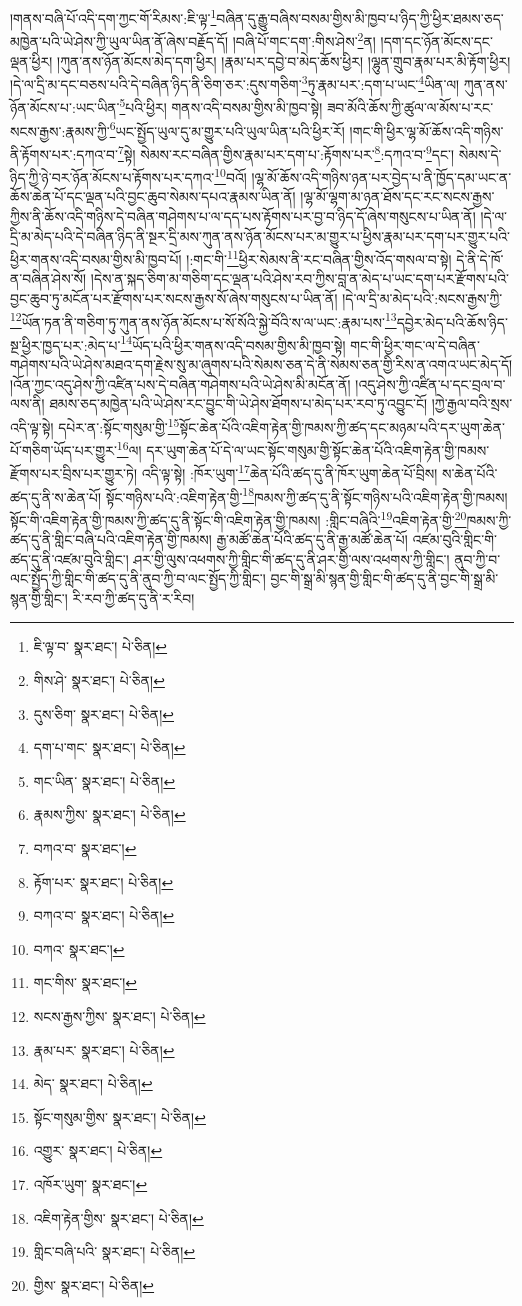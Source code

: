 །གནས་བཞི་པོ་འདི་དག་ཀྱང་གོ་རིམས་:ཇི་ལྟ་\footnote{ཇི་ལྟ་བ་  སྣར་ཐང་།  པེ་ཅིན། }བཞིན་དུ་རྒྱུ་བཞིས་བསམ་གྱིས་མི་ཁྱབ་པ་ཉིད་ཀྱི་ཕྱིར་ཐམས་ཅད་མཁྱེན་པའི་ཡེ་ཤེས་ཀྱི་ཡུལ་ཡིན་ནོ་ཞེས་བརྗོད་དོ། །བཞི་པོ་གང་དག་:གིས་ཤེས་\footnote{གིས་ཤེ་  སྣར་ཐང་།  པེ་ཅིན། }ན། །དག་དང་ཉོན་མོངས་དང་ལྡན་ཕྱིར། །ཀུན་ནས་ཉོན་མོངས་མེད་དག་ཕྱིར། །རྣམ་པར་དབྱེ་བ་མེད་ཆོས་ཕྱིར། །ལྷུན་གྲུབ་རྣམ་པར་མི་རྟོག་ཕྱིར། །དེ་ལ་དྲི་མ་དང་བཅས་པའི་དེ་བཞིན་ཉིད་ནི་ཅིག་ཅར་:དུས་གཅིག་\footnote{དུས་ཅིག་  སྣར་ཐང་།  པེ་ཅིན། }ཏུ་རྣམ་པར་:དག་པ་ཡང་\footnote{དག་པ་གང་  སྣར་ཐང་།  པེ་ཅིན། }ཡིན་ལ། ཀུན་ནས་ཉོན་མོངས་པ་:ཡང་ཡིན་\footnote{གང་ཡིན་  སྣར་ཐང་།  པེ་ཅིན། }པའི་ཕྱིར། གནས་འདི་བསམ་གྱིས་མི་ཁྱབ་སྟེ། ཟབ་མོའི་ཆོས་ཀྱི་ཚུལ་ལ་མོས་པ་རང་སངས་རྒྱས་:རྣམས་ཀྱི་\footnote{རྣམས་ཀྱིས་  སྣར་ཐང་།  པེ་ཅིན། }ཡང་སྤྱོད་ཡུལ་དུ་མ་གྱུར་པའི་ཡུལ་ཡིན་པའི་ཕྱིར་རོ། །གང་གི་ཕྱིར་ལྷ་མོ་ཆོས་འདི་གཉིས་ནི་རྟོགས་པར་:དཀའ་བ་\footnote{བཀའ་བ་  སྣར་ཐང་། }སྟེ། སེམས་རང་བཞིན་གྱིས་རྣམ་པར་དག་པ་:རྟོགས་པར་\footnote{རྟོག་པར་  སྣར་ཐང་།  པེ་ཅིན། }:དཀའ་བ་\footnote{བཀའ་བ་  སྣར་ཐང་།  པེ་ཅིན། }དང་། སེམས་དེ་ཉིད་ཀྱི་ཉེ་བར་ཉོན་མོངས་པ་རྟོགས་པར་དཀའ་\footnote{བཀའ་  སྣར་ཐང་། }བའོ། །ལྷ་མོ་ཆོས་འདི་གཉིས་ཉན་པར་བྱེད་པ་ནི་ཁྱོད་དམ་ཡང་ན་ཆོས་ཆེན་པོ་དང་ལྡན་པའི་བྱང་ཆུབ་སེམས་དཔའ་རྣམས་ཡིན་ནོ། །ལྷ་མོ་ལྷག་མ་ཉན་ཐོས་དང་རང་སངས་རྒྱས་ཀྱིས་ནི་ཆོས་འདི་གཉིས་དེ་བཞིན་གཤེགས་པ་ལ་དད་པས་རྟོགས་པར་བྱ་བ་ཉིད་དོ་ཞེས་གསུངས་པ་ཡིན་ནོ། །དེ་ལ་དྲི་མ་མེད་པའི་དེ་བཞིན་ཉིད་ནི་སྔར་དྲི་མས་ཀུན་ནས་ཉོན་མོངས་པར་མ་གྱུར་པ་ཕྱིས་རྣམ་པར་དག་པར་གྱུར་པའི་ཕྱིར་གནས་འདི་བསམ་གྱིས་མི་ཁྱབ་པོ། །:གང་གི་\footnote{གང་གིས་  སྣར་ཐང་། }ཕྱིར་སེམས་ནི་རང་བཞིན་གྱིས་འོད་གསལ་བ་སྟེ། དེ་ནི་དེ་ཁོ་ན་བཞིན་ཤེས་སོ། །དེས་ན་སྐད་ཅིག་མ་གཅིག་དང་ལྡན་པའི་ཤེས་རབ་ཀྱིས་བླ་ན་མེད་པ་ཡང་དག་པར་རྫོགས་པའི་བྱང་ཆུབ་ཏུ་མངོན་པར་རྫོགས་པར་སངས་རྒྱས་སོ་ཞེས་གསུངས་པ་ཡིན་ནོ། །དེ་ལ་དྲི་མ་མེད་པའི་:སངས་རྒྱས་ཀྱི་\footnote{སངས་རྒྱས་ཀྱིས་  སྣར་ཐང་།  པེ་ཅིན། }ཡོན་ཏན་ནི་གཅིག་ཏུ་ཀུན་ནས་ཉོན་མོངས་པ་སོ་སོའི་སྐྱེ་བོའི་ས་ལ་ཡང་:རྣམ་པས་\footnote{རྣམ་པར་  སྣར་ཐང་།  པེ་ཅིན། }དབྱེར་མེད་པའི་ཆོས་ཉིད་སྔ་ཕྱིར་ཁྱད་པར་:མེད་པ་\footnote{མེད་  སྣར་ཐང་།  པེ་ཅིན། }ཡོད་པའི་ཕྱིར་གནས་འདི་བསམ་གྱིས་མི་ཁྱབ་སྟེ། གང་གི་ཕྱིར་གང་ལ་དེ་བཞིན་གཤེགས་པའི་ཡེ་ཤེས་མཐའ་དག་རྗེས་སུ་མ་ཞུགས་པའི་སེམས་ཅན་དེ་ནི་སེམས་ཅན་གྱི་རིས་ན་འགའ་ཡང་མེད་དོ། །འོན་ཀྱང་འདུ་ཤེས་ཀྱི་འཛིན་པས་དེ་བཞིན་གཤེགས་པའི་ཡེ་ཤེས་མི་མངོན་ནོ། །འདུ་ཤེས་ཀྱི་འཛིན་པ་དང་བྲལ་བ་ལས་ནི། ཐམས་ཅད་མཁྱེན་པའི་ཡེ་ཤེས་རང་བྱུང་གི་ཡེ་ཤེས་ཐོགས་པ་མེད་པར་རབ་ཏུ་འབྱུང་ངོ། །ཀྱེ་རྒྱལ་བའི་སྲས་འདི་ལྟ་སྟེ། དཔེར་ན་:སྟོང་གསུམ་གྱི་\footnote{སྟོང་གསུམ་གྱིས་  སྣར་ཐང་།  པེ་ཅིན། }སྟོང་ཆེན་པོའི་འཇིག་རྟེན་གྱི་ཁམས་ཀྱི་ཚད་དང་མཉམ་པའི་དར་ཡུག་ཆེན་པོ་གཅིག་ཡོད་པར་གྱུར་\footnote{འགྱུར་  སྣར་ཐང་།  པེ་ཅིན། }ལ། དར་ཡུག་ཆེན་པོ་དེ་ལ་ཡང་སྟོང་གསུམ་གྱི་སྟོང་ཆེན་པོའི་འཇིག་རྟེན་གྱི་ཁམས་རྫོགས་པར་བྲིས་པར་གྱུར་ཏེ། འདི་ལྟ་སྟེ། :ཁོར་ཡུག་\footnote{འཁོར་ཡུག་  སྣར་ཐང་། }ཆེན་པོའི་ཚད་དུ་ནི་ཁོར་ཡུག་ཆེན་པོ་བྲིས། ས་ཆེན་པོའི་ཚད་དུ་ནི་ས་ཆེན་པོ། སྟོང་གཉིས་པའི་:འཇིག་རྟེན་གྱི་\footnote{འཇིག་རྟེན་གྱིས་  སྣར་ཐང་།  པེ་ཅིན། }ཁམས་ཀྱི་ཚད་དུ་ནི་སྟོང་གཉིས་པའི་འཇིག་རྟེན་གྱི་ཁམས། སྟོང་གི་འཇིག་རྟེན་གྱི་ཁམས་ཀྱི་ཚད་དུ་ནི་སྟོང་གི་འཇིག་རྟེན་གྱི་ཁམས། :གླིང་བཞིའི་\footnote{གླིང་བཞི་པའི་  སྣར་ཐང་།  པེ་ཅིན། }འཇིག་རྟེན་གྱི་\footnote{གྱིས་  སྣར་ཐང་།  པེ་ཅིན། }ཁམས་ཀྱི་ཚད་དུ་ནི་གླིང་བཞི་པའི་འཇིག་རྟེན་གྱི་ཁམས། རྒྱ་མཚོ་ཆེན་པོའི་ཚད་དུ་ནི་རྒྱ་མཚོ་ཆེན་པོ། འཛམ་བུའི་གླིང་གི་ཚད་དུ་ནི་འཛམ་བུའི་གླིང་། ཤར་གྱི་ལུས་འཕགས་ཀྱི་གླིང་གི་ཚད་དུ་ནི་ཤར་གྱི་ལས་འཕགས་ཀྱི་གླིང་། ནུབ་ཀྱི་བ་ལང་སྤྱོད་ཀྱི་གླིང་གི་ཚད་དུ་ནི་ནུབ་ཀྱི་བ་ལང་སྤྱོད་ཀྱི་གླིང་། བྱང་གི་སྒྲ་མི་སྙན་གྱི་གླིང་གི་ཚད་དུ་ནི་བྱང་གི་སྒྲ་མི་སྙན་གྱི་གླིང་། རི་རབ་ཀྱི་ཚད་དུ་ནི་ར་རིབ། 